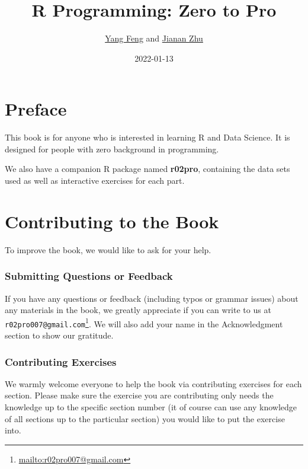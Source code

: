 \documentclass[
]{book}
\title{R Programming: Zero to Pro}
\author{\href{https://yangfeng.hosting.nyu.edu/}{Yang Feng} and \href{https://yangfeng.hosting.nyu.edu/authors/jianan-zhu/}{Jianan Zhu}}
\date{2022-01-13}
\renewcommand{\href}[2]{#2\footnote{\url{#1}}}
\begin{document}
\maketitle

{
\hypersetup{linkcolor=}
\setcounter{tocdepth}{1}
\tableofcontents
}
\hypertarget{preface}{%
\chapter*{Preface}\label{preface}}

This book is for anyone who is interested in learning R and Data Science. It is designed for people with zero background in programming.

We also have a companion R package named \textbf{r02pro}, containing the data sets used as well as interactive exercises for each part.

\hypertarget{contributing-to-the-book}{%
\chapter*{Contributing to the Book}\label{contributing-to-the-book}}

To improve the book, we would like to ask for your help.

\hypertarget{submitting-questions-or-feedback}{%
\subsection*{Submitting Questions or Feedback}\label{submitting-questions-or-feedback}}

If you have any questions or feedback (including typos or grammar issues) about any materials in the book, we greatly appreciate if you can write to us at \href{mailto:r02pro007@gmail.com}{\nolinkurl{r02pro007@gmail.com}}. We will also add your name in the Acknowledgment section to show our gratitude.

\hypertarget{contributing-exercises}{%
\subsection*{Contributing Exercises}\label{contributing-exercises}}

We warmly welcome everyone to help the book via contributing exercises for each section. Please make sure the exercise you are contributing only needs the knowledge up to the specific section number (it of course can use any knowledge of all sections up to the particular section) you would like to put the exercise into.
\end{document}
